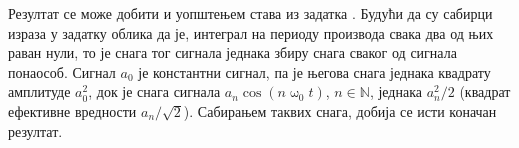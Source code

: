 Резултат се може добити и уопштењем става из задатка . Будући да су сабирци израза у задатку облика 
да је, интеграл на периоду производа свака два од њих раван нули, то је снага тог сигнала једнака збиру снага сваког 
од сигнала понаособ. Сигнал $a_0$ је константни сигнал, па је његова снага једнака квадрату амплитуде 
$a_0^2$, док је снага сигнала $a_n \cos(n\upomega_0 t)$, $n \in \mathbb N$, једнака $a_n^2/2$ (квадрат ефективне вредности
$a_n/\sqrt 2$). Сабирањем таквих снага, добија се исти коначан резултат.
 